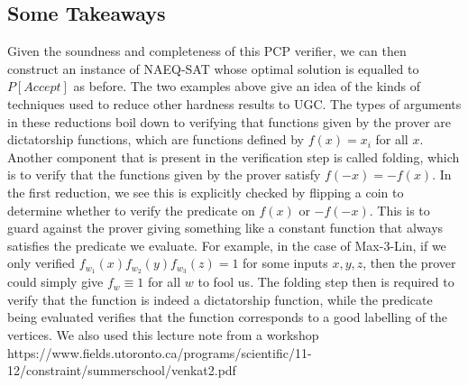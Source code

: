 \documentclass{article}
\newcommand{\1}{\mathbbm{1}}
\begin{document}
\subsection*{Some Takeaways}
Given the soundness and completeness of this PCP verifier, we can then construct an instance of NAEQ-SAT whose optimal solution is equalled to $P[Accept]$ as before. The two examples above give an idea of the kinds of techniques used to reduce other hardness results to UGC. The types of arguments in these reductions boil down to verifying that functions given by the prover are dictatorship functions, which are functions defined by $f(x) = x_i$ for all $x$. Another component that is present in the verification step is called folding, which is to verify that the functions given by the prover satisfy $f(-x) = -f(x)$. In the first reduction, we see this is explicitly checked by flipping a coin to determine whether to verify the predicate on $f(x)$ or $-f(-x)$. This is to guard against the prover giving something like a constant function that always satisfies the predicate we evaluate. For example, in the case of Max-3-Lin, if we only verified $f_{w_1}(x)f_{w_2}(y)f_{w_3}(z) = 1$ for some inputs $x,y,z$, then the prover could simply give $f_w \equiv 1$ for all $w$ to fool us. The folding step then is required to verify that the function is indeed a dictatorship function, while the predicate being evaluated verifies that the function corresponds to a good labelling of the vertices.
\printbibliography
We also used this lecture note from a workshop\\ https://www.fields.utoronto.ca/programs/scientific/11-12/constraint/summerschool/venkat2.pdf
\end{document}
